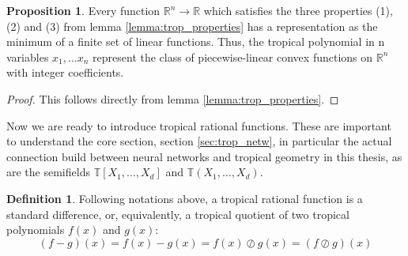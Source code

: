 \documentclass{article}
\theoremstyle{definition}
\newtheorem{definition}[theorem]{Definition}
\newtheorem{proposition}[theorem]{Proposition}
\begin{document}
\begin{proposition}
Every function $\mathbb{R}^{n} \to \mathbb{R}$ which satisfies the three properties (1), (2) and (3) from lemma 	\ref{lemma:trop_properties} has a representation as the minimum of a finite set of linear functions. Thus, the tropical polynomial in n variables $x_{1}, \dots x_{n}$ represent the class of piecewise-linear convex functions on $\mathbb{R}^{n}$ with integer coefficients.
\end{proposition}

\begin{proof}
This follows directly from lemma \ref{lemma:trop_properties}.
\end{proof}

Now we are ready to introduce tropical rational functions. These are important to understand the core section, section \ref{sec:trop_netw}, in particular the actual connection build between neural networks and tropical geometry in this thesis, as are the semifields $\mathbb{T}[X_{1} , \dots , X_{d}]$ and $\mathbb{T}(X_{1} , \dots , X_{d})$.

\begin{definition} \cite[p.~3]{zhang2018tropical}
Following notations above, a tropical rational function is a standard difference, or, equivalently,
a tropical quotient of two tropical polynomials $f(x)$ and
$g(x)$:
$$ (f-g)(x) = f(x) - g(x) = f(x) \oslash g(x) = (f \oslash g)(x)$$
\end{definition}
\end{document}
